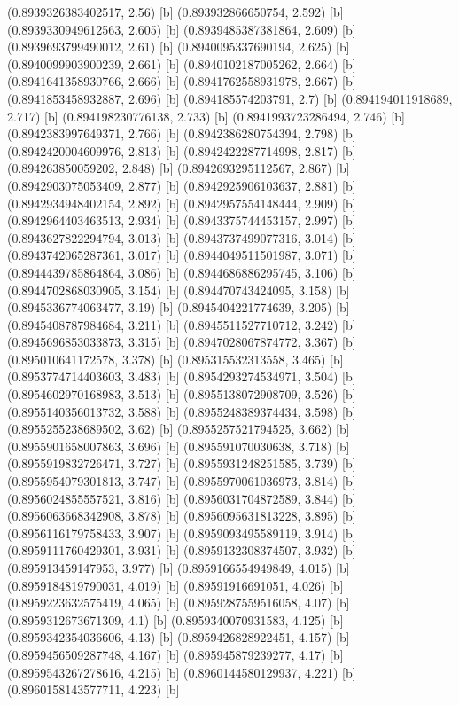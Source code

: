 {{{(0.8939326383402517, 2.56) [b] 
(0.893932866650754, 2.592) [b] 
(0.8939330949612563, 2.605) [b] 
(0.8939485387381864, 2.609) [b] 
(0.8939693799490012, 2.61) [b] 
(0.8940095337690194, 2.625) [b] 
(0.8940099903900239, 2.661) [b] 
(0.8940102187005262, 2.664) [b] 
(0.8941641358930766, 2.666) [b] 
(0.8941762558931978, 2.667) [b] 
(0.8941853458932887, 2.696) [b] 
(0.894185574203791, 2.7) [b] 
(0.894194011918689, 2.717) [b] 
(0.894198230776138, 2.733) [b] 
(0.8941993723286494, 2.746) [b] 
(0.8942383997649371, 2.766) [b] 
(0.8942386280754394, 2.798) [b] 
(0.8942420004609976, 2.813) [b] 
(0.8942422287714998, 2.817) [b] 
(0.894263850059202, 2.848) [b] 
(0.8942693295112567, 2.867) [b] 
(0.8942903075053409, 2.877) [b] 
(0.8942925906103637, 2.881) [b] 
(0.8942934948402154, 2.892) [b] 
(0.8942957554148444, 2.909) [b] 
(0.8942964403463513, 2.934) [b] 
(0.8943375744453157, 2.997) [b] 
(0.8943627822294794, 3.013) [b] 
(0.8943737499077316, 3.014) [b] 
(0.8943742065287361, 3.017) [b] 
(0.8944049511501987, 3.071) [b] 
(0.8944439785864864, 3.086) [b] 
(0.8944686886295745, 3.106) [b] 
(0.8944702868030905, 3.154) [b] 
(0.894470743424095, 3.158) [b] 
(0.8945336774063477, 3.19) [b] 
(0.8945404221774639, 3.205) [b] 
(0.8945408787984684, 3.211) [b] 
(0.8945511527710712, 3.242) [b] 
(0.8945696853033873, 3.315) [b] 
(0.8947028067874772, 3.367) [b] 
(0.895010641172578, 3.378) [b] 
(0.895315532313558, 3.465) [b] 
(0.8953774714403603, 3.483) [b] 
(0.8954293274534971, 3.504) [b] 
(0.8954602970168983, 3.513) [b] 
(0.8955138072908709, 3.526) [b] 
(0.8955140356013732, 3.588) [b] 
(0.8955248389374434, 3.598) [b] 
(0.8955255238689502, 3.62) [b] 
(0.8955257521794525, 3.662) [b] 
(0.8955901658007863, 3.696) [b] 
(0.895591070030638, 3.718) [b] 
(0.8955919832726471, 3.727) [b] 
(0.8955931248251585, 3.739) [b] 
(0.8955954079301813, 3.747) [b] 
(0.8955970061036973, 3.814) [b] 
(0.8956024855557521, 3.816) [b] 
(0.8956031704872589, 3.844) [b] 
(0.8956063668342908, 3.878) [b] 
(0.8956095631813228, 3.895) [b] 
(0.8956116179758433, 3.907) [b] 
(0.8959093495589119, 3.914) [b] 
(0.8959111760429301, 3.931) [b] 
(0.8959132308374507, 3.932) [b] 
(0.895913459147953, 3.977) [b] 
(0.8959166554949849, 4.015) [b] 
(0.8959184819790031, 4.019) [b] 
(0.89591916691051, 4.026) [b] 
(0.8959223632575419, 4.065) [b] 
(0.8959287559516058, 4.07) [b] 
(0.8959312673671309, 4.1) [b] 
(0.8959340070931583, 4.125) [b] 
(0.8959342354036606, 4.13) [b] 
(0.8959426828922451, 4.157) [b] 
(0.8959456509287748, 4.167) [b] 
(0.895945879239277, 4.17) [b] 
(0.8959543267278616, 4.215) [b] 
(0.8960144580129937, 4.221) [b] 
(0.8960158143577711, 4.223) [b] 
}}}
